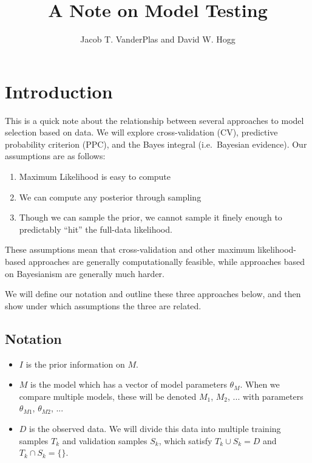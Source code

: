 \documentclass[12pt]{article}
\title{A Note on Model Testing}
\author{Jacob T. VanderPlas and David W. Hogg}
\newcommand{\highlight}[1]{{\color{green} #1}}
\begin{document}
\maketitle

\section{Introduction}

This is a quick note about the relationship between several approaches to
model selection based on data.  We will explore cross-validation (CV),
\highlight{predictive probability criterion (PPC)}, and the Bayes integral
(i.e.~Bayesian evidence).  Our assumptions are as follows:
\begin{enumerate}
  \item Maximum Likelihood is easy to compute
  \item We can compute any posterior through sampling
  \item Though we can sample the prior, we cannot sample it finely enough
    to predictably ``hit'' the full-data likelihood.
\end{enumerate}
These assumptions mean that cross-validation and other maximum likelihood-based
approaches are generally computationally feasible, while approaches based
on Bayesianism are generally much harder.

We will define our notation and outline these three approaches below, and
then show under which assumptions the three are related.

\subsection{Notation}
\begin{itemize}
  \item $I$ is the prior information on $M$.
  \item $M$ is the model which has a vector of model parameters $\theta_M$.
    When we compare multiple models, these will be denoted $M_1$, $M_2$, ...
    with parameters $\theta_{M1}$, $\theta_{M2}$, ...
  \item $D$ is the observed data.  We will divide this data into multiple
    training samples $T_k$ and validation samples $S_k$, which satisfy
    $T_k \cup S_k = D$ and $T_k \cap S_k = \{\}$.
\end{itemize}
\end{document}
